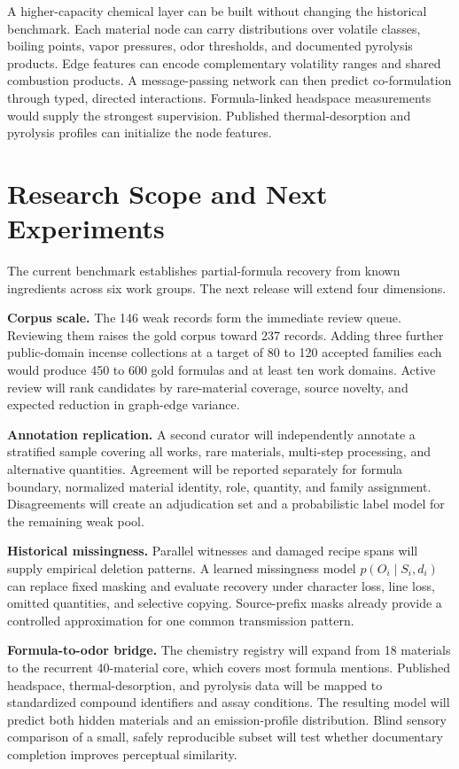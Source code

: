 \documentclass[11pt,a4paper]{article}
\begin{document}
A higher-capacity chemical layer can be built without changing the historical benchmark. Each material node can carry distributions over volatile classes, boiling points, vapor pressures, odor thresholds, and documented pyrolysis products. Edge features can encode complementary volatility ranges and shared combustion products. A message-passing network can then predict co-formulation through typed, directed interactions. Formula-linked headspace measurements would supply the strongest supervision. Published thermal-desorption and pyrolysis profiles can initialize the node features.

\section{Research Scope and Next Experiments}

The current benchmark establishes partial-formula recovery from known ingredients across six work groups. The next release will extend four dimensions.

\textbf{Corpus scale.} The 146 weak records form the immediate review queue. Reviewing them raises the gold corpus toward 237 records. Adding three further public-domain incense collections at a target of 80 to 120 accepted families each would produce 450 to 600 gold formulas and at least ten work domains. Active review will rank candidates by rare-material coverage, source novelty, and expected reduction in graph-edge variance.

\textbf{Annotation replication.} A second curator will independently annotate a stratified sample covering all works, rare materials, multi-step processing, and alternative quantities. Agreement will be reported separately for formula boundary, normalized material identity, role, quantity, and family assignment. Disagreements will create an adjudication set and a probabilistic label model for the remaining weak pool.

\textbf{Historical missingness.} Parallel witnesses and damaged recipe spans will supply empirical deletion patterns. A learned missingness model $p(O_i\mid S_i,d_i)$ can replace fixed masking and evaluate recovery under character loss, line loss, omitted quantities, and selective copying. Source-prefix masks already provide a controlled approximation for one common transmission pattern.

\textbf{Formula-to-odor bridge.} The chemistry registry will expand from 18 materials to the recurrent 40-material core, which covers most formula mentions. Published headspace, thermal-desorption, and pyrolysis data will be mapped to standardized compound identifiers and assay conditions. The resulting model will predict both hidden materials and an emission-profile distribution. Blind sensory comparison of a small, safely reproducible subset will test whether documentary completion improves perceptual similarity.
\end{document}
